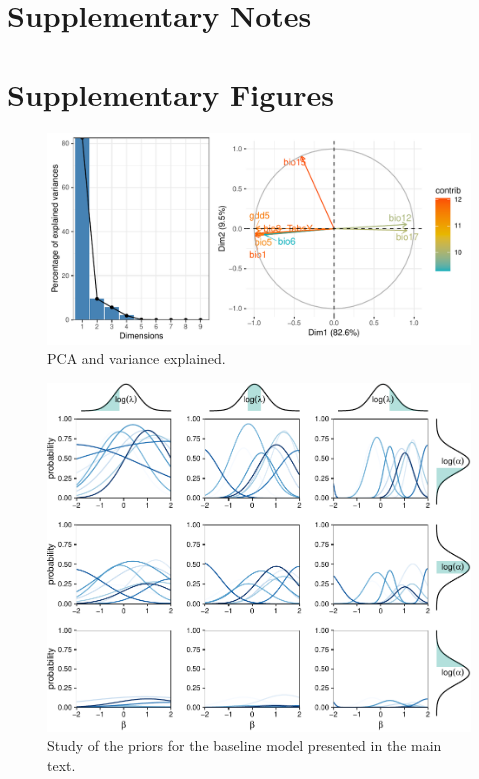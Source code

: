\documentclass[11pt, a4paper]{article}
\begin{document}
\section*{Supplementary Notes}
\section*{Supplementary Figures}

\begin{figure}[ht]
  \centering
    \vspace{0.5cm}
    \includegraphics[width=1\textwidth]{figures/variances}
    	  \vspace{0.3cm}
	   \caption{PCA and variance explained.}
      \label{sfig:pca}
\end{figure}

\clearpage

\begin{figure}[ht]
  \centering
    \vspace{0.5cm}
    \includegraphics[width=1\textwidth]{figures/prior}
    	  \vspace{0.3cm}
	   \caption{Study of the priors for the baseline model presented in the main text.}
      \label{sfig:sensitivity}
\end{figure}
\end{document}
